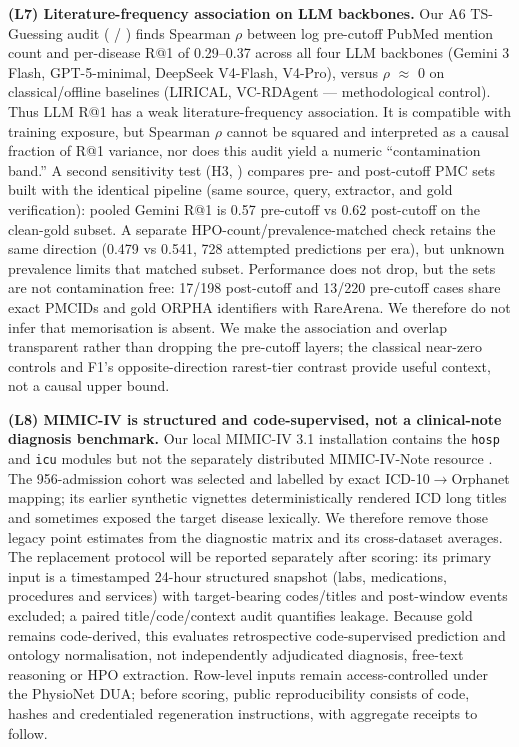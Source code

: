 \textbf{(L7) Literature-frequency association on LLM backbones.} Our A6
TS-Guessing audit ( / ) finds Spearman \ensuremath{\rho} between log
pre-cutoff PubMed mention count and per-disease R@1 of 0.29--0.37
across all four LLM backbones (Gemini 3 Flash, GPT-5-minimal, DeepSeek
V4-Flash, V4-Pro), versus \ensuremath{\rho} \ensuremath{\approx} 0 on classical/offline baselines
(LIRICAL, VC-RDAgent --- methodological control). Thus LLM R@1 has a weak
literature-frequency association. It is compatible with training exposure,
but Spearman \ensuremath{\rho} cannot be squared and interpreted as a causal fraction of R@1
variance, nor does this audit yield a numeric ``contamination band.'' A second
sensitivity test (H3, ) compares pre- and post-cutoff PMC sets built with the identical
pipeline (same source, query, extractor, and gold verification): pooled
Gemini R@1 is 0.57 pre-cutoff vs 0.62 post-cutoff on the clean-gold
subset. A separate HPO-count/prevalence-matched check retains the same
direction (0.479 vs 0.541, 728 attempted predictions per era), but
unknown prevalence limits that matched subset. Performance does not drop,
but the sets are not contamination
free: 17/198 post-cutoff and 13/220 pre-cutoff cases share exact PMCIDs and
gold ORPHA identifiers with RareArena. We therefore do not infer that
memorisation is absent. We make the association and overlap transparent
rather than dropping the pre-cutoff layers; the classical near-zero controls
and F1's opposite-direction rarest-tier contrast provide useful context, not
a causal upper bound.

\textbf{(L8) MIMIC-IV is structured and code-supervised, not a clinical-note diagnosis benchmark.} Our local MIMIC-IV 3.1 installation
\citep{mimiciv2023,mimiciv31} contains the \texttt{hosp} and \texttt{icu} modules but not
the separately distributed MIMIC-IV-Note resource
\citep{mimicivnote22}. The 956-admission cohort was
selected and labelled by exact ICD-10\ensuremath{\rightarrow}Orphanet mapping; its earlier synthetic
vignettes deterministically rendered ICD long titles and sometimes exposed the
target disease lexically. We therefore remove those legacy point estimates from
the diagnostic matrix and its cross-dataset averages. The replacement
protocol will be reported separately after scoring: its primary input is a timestamped 24-hour
structured snapshot (labs, medications, procedures and services) with
target-bearing codes/titles and post-window events excluded; a paired
title/code/context audit quantifies leakage. Because gold remains code-derived,
this evaluates retrospective code-supervised prediction and ontology
normalisation, not independently adjudicated diagnosis, free-text reasoning or
HPO extraction. Row-level inputs remain access-controlled under the PhysioNet
DUA; before scoring, public reproducibility consists of code, hashes and
credentialed regeneration instructions, with aggregate receipts to follow.

